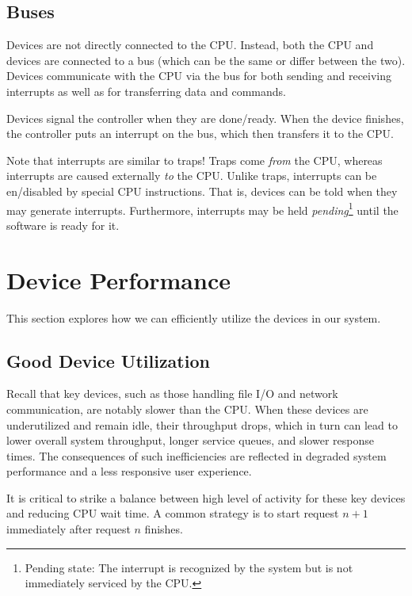 \documentclass{report}
\newcommand{\asideBegin}[1]{\begin{tcolorbox}[colback=orange!5!white,colframe=black!75!orange,title={Aside:
      #1}]}
\newcommand{\asideEnd}{\end{tcolorbox}}
\begin{document}
\subsection{Buses}
Devices are not directly connected to the CPU. Instead, both the CPU and devices are connected to a
bus (which can be the same or differ between the two). Devices communicate with the CPU via the bus
for both sending and receiving interrupts as well as for transferring data and commands.

Devices signal the controller when they are done/ready. When the device finishes, the controller
puts an interrupt on the bus, which then transfers it to the CPU.


\asideBegin{CPU's and Interrupts}
Note that interrupts are similar to traps! Traps come \textit{from} the CPU, whereas interrupts are caused
externally \textit{to} the CPU. Unlike traps, interrupts can be en/disabled by special CPU
instructions. That is, devices can be told when they may generate interrupts. Furthermore,
interrupts may be held \textit{pending}\footnote{Pending state: The interrupt is recognized
  by the system but is not immediately serviced by the CPU.} until the software is ready for it.
\asideEnd





\section{Device Performance}
This section explores how we can efficiently utilize the devices in our system.


\subsection{Good Device Utilization}
\label{subsec:GDU}
Recall that key devices, such as those handling file I/O and network communication, are notably
slower than the CPU. When these devices are underutilized and remain idle, their throughput drops,
which in turn can lead to lower overall system throughput, longer service queues, and slower
response times. The consequences of such inefficiencies are reflected in degraded system performance
and a less responsive user experience.

It is critical to strike a balance between high level of activity for these key devices and reducing
CPU wait time. A common strategy is to start request $n + 1$ immediately after request $n$ finishes.
\end{document}
